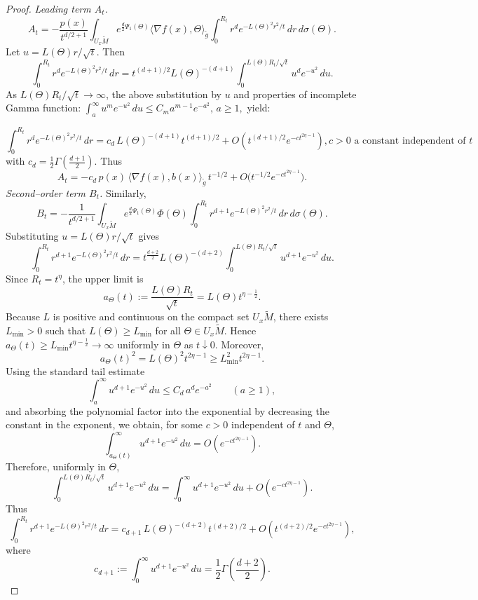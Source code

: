 \documentclass{amsart}
\theoremstyle{definition}
\theoremstyle{remark}
\newcommand{\0}{\boldsymbol{0}}
\begin{document}
\begin{proof}
\medskip\noindent
\textit{Leading term $A_t$.}
\[
A_t
= -\frac{p(x)}{t^{d/2+1}}
\int_{U_x\widetilde M}\! e^{\frac d2\Psi_1(\Theta)}
\langle \nabla f(x),\Theta\rangle_{\widetilde g}
\int_0^{R_t} r^{d} e^{-L(\Theta)^2 r^2/t}\,dr\,d\sigma(\Theta).
\]
Let $u=L(\Theta)r/\sqrt t$. Then
\[
\int_0^{R_t} r^{d}e^{-L(\Theta)^2 r^2/t}\,dr
= t^{(d+1)/2} L(\Theta)^{-(d+1)}
  \int_0^{L(\Theta)R_t/\sqrt t} u^{d} e^{-u^2}\,du.
\]
As $L(\Theta)R_t/\sqrt t\to\infty$, the above substitution by $u$ and properties of incomplete Gamma function: $\int_a^\infty u^m e^{-u^2}\,du \le C_m a^{m-1}e^{-a^2}, \, a\ge1,$ yield:


\[
\int_0^{R_t} r^{d}e^{-L(\Theta)^2 r^2/t}\,dr
= c_d\,L(\Theta)^{-(d+1)} t^{(d+1)/2} + O\!\left(t^{(d+1)/2}e^{-ct^{2\eta-1}}\right), c>0\text{ a constant independent of }t
\]
with $c_d=\tfrac12\Gamma(\frac{d+1}{2})$.
Thus
\begin{equation}
A_t
= -c_d\,p(x)\,\langle \nabla f(x), b(x)\rangle_{\widetilde g}\,t^{-1/2}
  + O\!\bigl(t^{-1/2}e^{-ct^{2\eta-1}}\bigr).
\end{equation}
\medskip\noindent
\textit{Second--order term $B_t$.}
Similarly,
\[
B_t
= -\frac{1}{t^{d/2+1}}
\int_{U_x\widetilde M} e^{\frac d2\Psi_1(\Theta)}\Phi(\Theta)
\int_0^{R_t} r^{d+1} e^{-L(\Theta)^2 r^2/t}\,dr\,d\sigma(\Theta).
\]
Substituting $u=L(\Theta)r/\sqrt t$ gives
\[
\int_0^{R_t} r^{d+1} e^{-L(\Theta)^2 r^2/t}\,dr
= t^{\frac{d+2}{2}} L(\Theta)^{-(d+2)}
   \int_0^{L(\Theta)R_t/\sqrt t} u^{d+1} e^{-u^2}\,du.
\]
Since $R_t=t^\eta$, the upper limit is
\[
a_\Theta(t):=\frac{L(\Theta)R_t}{\sqrt t}
= L(\Theta)t^{\eta-\frac12}.
\]
Because $L$ is positive and continuous on the compact set $U_x\widetilde M$, there exists
$L_{\min}>0$ such that $L(\Theta)\ge L_{\min}$ for all $\Theta\in U_x\widetilde M$. Hence
$a_\Theta(t)\ge L_{\min}t^{\eta-\frac12}\to\infty$ uniformly in $\Theta$ as $t\downarrow0$. Moreover,
\[
a_\Theta(t)^2=L(\Theta)^2t^{2\eta-1}\ge L_{\min}^2t^{2\eta-1}.
\]
Using the standard tail estimate
\[
\int_a^\infty u^{d+1}e^{-u^2}\,du
\le C_d\,a^d e^{-a^2}\qquad (a\ge1),
\]
and absorbing the polynomial factor into the exponential by decreasing the constant in the exponent,
we obtain, for some $c>0$ independent of $t$ and $\Theta$,
\[
\int_{a_\Theta(t)}^\infty u^{d+1}e^{-u^2}\,du
=O\!\left(e^{-c t^{2\eta-1}}\right).
\]
Therefore, uniformly in $\Theta$,
\[
\int_0^{L(\Theta)R_t/\sqrt t} u^{d+1} e^{-u^2}\,du
= \int_0^\infty u^{d+1} e^{-u^2}\,du
  + O\!\left(e^{-c t^{2\eta-1}}\right).
\]
Thus
\[
\int_0^{R_t} r^{d+1} e^{-L(\Theta)^2 r^2/t}\,dr
= c_{d+1}\,L(\Theta)^{-(d+2)} t^{(d+2)/2}
  + O\!\left(t^{(d+2)/2} e^{-c t^{2\eta-1}}\right),
\]
where
\[
c_{d+1}:=\int_0^\infty u^{d+1}e^{-u^2}\,du
=\frac12\Gamma\!\left(\frac{d+2}{2}\right).
\]






\end{proof}
\end{document}
